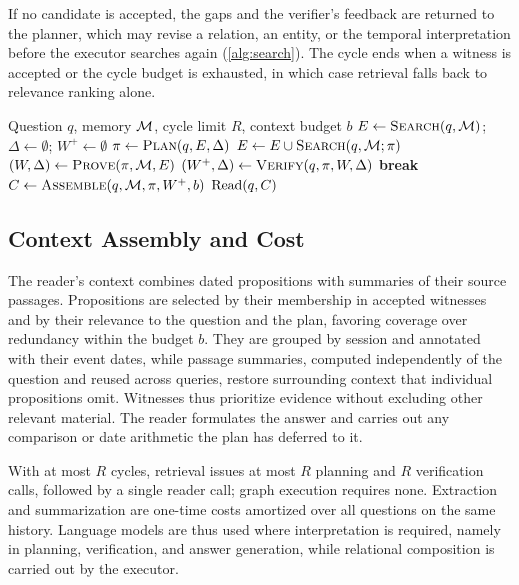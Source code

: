 If no candidate is accepted, the gaps and the verifier's feedback are
returned to the planner, which may revise a relation, an entity, or the
temporal interpretation before the executor searches again
(\cref{alg:search}). The cycle ends when a witness is accepted or the
cycle budget is exhausted, in which case retrieval falls back to
relevance ranking alone.

\begin{algorithm}[t]
\caption{Witness-guided memory retrieval}
\label{alg:search}
\small
\begin{algorithmic}[1]
\Require Question $q$, memory $\mathcal{M}$, cycle limit $R$, context budget $b$
\State $E\gets\textsc{Search}(q,\mathcal{M})$; $\Delta\gets\emptyset$; $W^+\gets\emptyset$
  \State $\pi\gets\textsc{Plan}(q,E,\Delta)$
  \State $E\gets E\cup\textsc{Search}(q,\mathcal{M};\pi)$
  \State $(W,\Delta)\gets\textsc{Prove}(\pi,\mathcal{M},E)$
  \State $(W^+,\Delta)\gets\textsc{Verify}(q,\pi,W,\Delta)$
   \State \textbf{break} \EndIf
\EndFor
\State $C\gets\textsc{Assemble}(q,\mathcal{M},\pi,W^+,b)$
\State \Return $\mathrm{Read}(q,C)$
\end{algorithmic}
\end{algorithm}

\subsection{Context Assembly and Cost}
\label{sec:method-respond}
\label{sec:method-guarantees}

The reader's context combines dated propositions with summaries of their
source passages. Propositions are selected by their membership in
accepted witnesses and by their relevance to the question and the plan,
favoring coverage over redundancy within the budget $b$. They are grouped
by session and annotated with their event dates, while passage summaries,
computed independently of the question and reused across queries,
restore surrounding context that individual propositions omit. Witnesses
thus prioritize evidence without excluding other relevant material. The
reader formulates the answer and carries out any comparison or date
arithmetic the plan has deferred to it.

With at most $R$ cycles, retrieval issues at most $R$ planning and $R$
verification calls, followed by a single reader call; graph execution
requires none. Extraction and summarization are one-time costs amortized
over all questions on the same history. Language models are thus used
where interpretation is required, namely in planning, verification, and
answer generation, while relational composition is carried out by the
executor.
